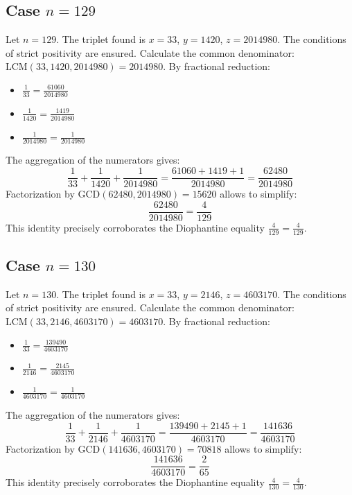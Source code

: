 \documentclass[11pt,a4paper]{article}
\begin{document}
\subsection{Case $n = 129$}
Let $n = 129$. The triplet found is $x = 33$, $y = 1420$, $z = 2014980$.
The conditions of strict positivity are ensured.
Calculate the common denominator: $\text{LCM}(33, 1420, 2014980) = 2014980$.
By fractional reduction:
\begin{itemize}
    \item $\frac{1}{33} = \frac{61060}{2014980}$
    \item $\frac{1}{1420} = \frac{1419}{2014980}$
    \item $\frac{1}{2014980} = \frac{1}{2014980}$
\end{itemize}
The aggregation of the numerators gives:
$$ \frac{1}{33} + \frac{1}{1420} + \frac{1}{2014980} = \frac{61060 + 1419 + 1}{2014980} = \frac{62480}{2014980} $$
Factorization by $\text{GCD}(62480, 2014980) = 15620$ allows to simplify:
$$ \frac{62480}{2014980} = \frac{4}{129} $$
This identity precisely corroborates the Diophantine equality $\frac{4}{129} = \frac{4}{129}$.

\subsection{Case $n = 130$}
Let $n = 130$. The triplet found is $x = 33$, $y = 2146$, $z = 4603170$.
The conditions of strict positivity are ensured.
Calculate the common denominator: $\text{LCM}(33, 2146, 4603170) = 4603170$.
By fractional reduction:
\begin{itemize}
    \item $\frac{1}{33} = \frac{139490}{4603170}$
    \item $\frac{1}{2146} = \frac{2145}{4603170}$
    \item $\frac{1}{4603170} = \frac{1}{4603170}$
\end{itemize}
The aggregation of the numerators gives:
$$ \frac{1}{33} + \frac{1}{2146} + \frac{1}{4603170} = \frac{139490 + 2145 + 1}{4603170} = \frac{141636}{4603170} $$
Factorization by $\text{GCD}(141636, 4603170) = 70818$ allows to simplify:
$$ \frac{141636}{4603170} = \frac{2}{65} $$
This identity precisely corroborates the Diophantine equality $\frac{4}{130} = \frac{4}{130}$.
\end{document}
